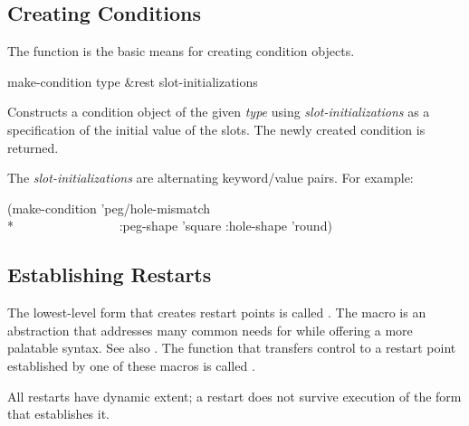 \subsection{Creating Conditions}

The function  is the basic means for
creating condition objects.

\begin{defun}[Function]
make-condition type &rest slot-initializations

Constructs a condition object of the given \emph{type} using
\emph{slot-initializations} as a specification of the initial value of the
slots. The newly created condition is returned.

The \emph{slot-initializations} are alternating keyword/value pairs.  For
example:
\begin{lisp}
(make-condition 'peg/hole-mismatch \\*
~~~~~~~~~~~~~~~~:peg-shape 'square :hole-shape 'round)
\end{lisp}
\end{defun}

\subsection{Establishing Restarts}

The lowest-level form that creates restart points is called .
The  macro is an abstraction that addresses many common needs
for  while offering a more palatable syntax. See also
.  The function that transfers control to a restart
point established by one of these macros is called .

All restarts have dynamic extent; a restart does not survive execution of the
form that establishes it.

